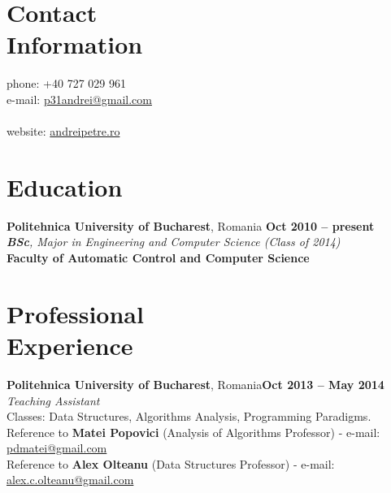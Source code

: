 \documentclass[margin,line]{resume}
\begin{document}
\begin{resume}

    \section{\mysidestyle Contact\\Information}

	phone: +40 727 029 961              \\
	e-mail:  \href{mailto:p31andrei@gmail.com}{p31andrei@gmail.com}  \vspace{0mm}\\\vspace{-4.5mm}\\%
	website: \href{http://andreipetre.ro}{andreipetre.ro}

    \section{\mysidestyle Education}

	\textbf{Politehnica University of Bucharest}, Romania \hfill \textbf{ Oct 2010 -- present}\vspace{1.2mm}\\%
	\textsl{\textbf{BSc}, Major in Engineering and Computer Science (Class of 2014)}\vspace{1.5mm}\\
	\small{\textbf{Faculty of Automatic Control and Computer Science}}

    \section{\mysidestyle Professional\\Experience}

	\vspace{1.2mm}\textbf{Politehnica University of Bucharest}, Romania\hfill \textbf{Oct 2013 -- May 2014}\vspace{1.2mm}\\
	\vspace{1mm} \textsl{Teaching Assistant}\vspace{1.5mm}\\
	Classes: Data Structures, Algorithms Analysis, Programming Paradigms.\vspace{1.2mm}\\
	\small{Reference to \textbf{Matei Popovici} (Analysis of Algorithms Professor) - e-mail: \href{mailto:pdmatei@gmail.com}{pdmatei@gmail.com}}\\
	\small{Reference to \textbf{Alex Olteanu} (Data Structures Professor) - e-mail: \href{mailto:alex.c.olteanu@gmail.com}{alex.c.olteanu@gmail.com}}


\end{resume}
\end{document}
